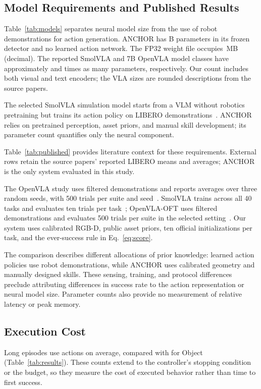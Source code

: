 \documentclass[letterpaper,10pt,conference]{ieeeconf}
\newcommand{\method}{ANCHOR}
\begin{document}
\subsection{Model Requirements and Published Results}
\label{sec:comparison}
Table~\ref{tab:models} separates neural model size from the use of robot
demonstrations for action generation. \method{} has \NeuralBillion{}B
parameters in its frozen detector and no learned action network. The FP32
weight file occupies \DetectorWeightMB{}\,MB (decimal). The reported
SmolVLA and 7B OpenVLA model classes have approximately \SmolParameterRatio{}
and \OpenVLAParameterRatio{} times as many parameters, respectively.
Our count includes both visual and text encoders; the VLA sizes are rounded
descriptions from the source papers.

The selected SmolVLA simulation model starts from a VLM without robotics
pretraining but trains its action policy on LIBERO demonstrations~\cite{smolvla}.
\method{} relies on pretrained perception, asset priors, and manual skill
development; its parameter count quantifies only the neural component.



Table~\ref{tab:published} provides literature context for these requirements.
External rows retain the source papers' reported LIBERO means and averages;
\method{} is the only system evaluated in this study.

The OpenVLA study uses filtered demonstrations and reports averages over
three random seeds, with 500 trials per suite and seed~\cite{openvla}.
SmolVLA trains across all 40 tasks and evaluates ten trials per
task~\cite{smolvla}; OpenVLA-OFT uses filtered demonstrations and evaluates
500 trials per suite in the selected setting~\cite{openvlaoft}.
Our system uses calibrated RGB-D, public asset priors, ten official
initializations per task, and the ever-success rule in Eq.~\eqref{eq:score}.

The comparison describes different allocations of prior knowledge:
learned action policies use robot demonstrations, while \method{} uses
calibrated geometry and manually designed skills. These sensing, training,
and protocol differences preclude attributing differences in success rate
to the action representation or neural model size. Parameter counts also
provide no measurement of relative latency or peak memory.

\subsection{Execution Cost}
Long episodes use \LongMeanSteps{} actions on average, compared with
\ObjectMeanSteps{} for Object (Table~\ref{tab:results}). These counts extend
to the controller's stopping condition or the budget, so they measure the
cost of executed behavior rather than time to first success.
\end{document}
